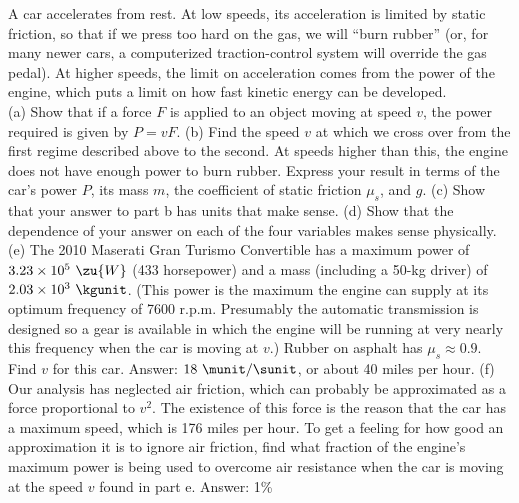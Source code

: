 A car accelerates from rest. At low speeds, its acceleration is limited
by static friction, so that if we press too hard on the gas, we will
``burn rubber'' (or, for many newer cars, a computerized traction-control
system will override the gas pedal). At higher speeds, the limit on
acceleration comes from the power of the engine, which puts a limit on
how fast kinetic energy can be developed.\\
(a) Show that if a force $F$ is applied to an object moving at
speed $v$, the power required is given by $P=vF$.\hwendpart
(b) Find the speed $v$ at which we cross over from the first regime
described above to the second. At speeds higher than this, the engine
does not have enough power to burn rubber. Express your result in terms of the
car's power $P$, its mass $m$, the  coefficient of static friction $\mu_s$,
and $g$.\answercheck\hwendpart
(c) Show that your answer to part b has units that make sense.\hwendpart
(d) Show that the dependence of your answer on each of the four variables
makes sense physically.\hwendpart
(e) The 2010 Maserati Gran Turismo Convertible has a maximum power of
$3.23\times10^5\ \zu{W}$ (433 horsepower) and a mass (including a 50-kg driver)
of $2.03\times10^3\ \kgunit$. (This power is the maximum the engine can supply
at its optimum frequency of 7600 r.p.m. Presumably the automatic transmission is designed so a gear is available
in which the engine will be running at very nearly this frequency when
the car is moving at $v$.) Rubber on asphalt has $\mu_s\approx0.9$.
Find $v$ for this car. Answer: $18\ \munit/\sunit$, or about 40 miles per hour.\hwendpart
(f) Our analysis has neglected air friction, which can probably be approximated
as a force proportional to $v^2$. The existence of this force is the reason that the
car has a maximum speed, which is 176 miles per hour. To get a feeling for how good an approximation
it is to ignore air friction, find what fraction of the engine's
maximum power is being used to overcome air resistance when the car is moving at
the speed $v$ found in part e. Answer: 1\%
